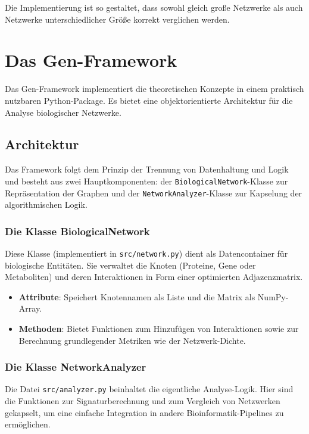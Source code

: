 ﻿\documentclass[a4paper,12pt]{article}
\theoremstyle{definition}
\begin{document}
Die Implementierung ist so gestaltet, dass sowohl gleich große Netzwerke als auch Netzwerke unterschiedlicher Größe korrekt verglichen werden.

\section{Das Gen-Framework}

Das Gen-Framework implementiert die theoretischen Konzepte in einem praktisch nutzbaren Python-Package. Es bietet eine objektorientierte Architektur für die Analyse biologischer Netzwerke.

\subsection{Architektur}

Das Framework folgt dem Prinzip der Trennung von Datenhaltung und Logik und besteht aus zwei Hauptkomponenten: der \texttt{BiologicalNetwork}-Klasse zur Repräsentation der Graphen und der \texttt{NetworkAnalyzer}-Klasse zur Kapselung der algorithmischen Logik.

\subsubsection{Die Klasse BiologicalNetwork}

Diese Klasse (implementiert in \texttt{src/network.py}) dient als Datencontainer für biologische Entitäten. Sie verwaltet die Knoten (Proteine, Gene oder Metaboliten) und deren Interaktionen in Form einer optimierten Adjazenzmatrix.
\begin{itemize}
	\item \textbf{Attribute}: Speichert Knotennamen als Liste und die Matrix als NumPy-Array.
	\item \textbf{Methoden}: Bietet Funktionen zum Hinzufügen von Interaktionen sowie zur Berechnung grundlegender Metriken wie der Netzwerk-Dichte.
\end{itemize}

\subsubsection{Die Klasse NetworkAnalyzer}

Die Datei \texttt{src/analyzer.py} beinhaltet die eigentliche Analyse-Logik. Hier sind die Funktionen zur Signaturberechnung und zum Vergleich von Netzwerken gekapselt, um eine einfache Integration in andere Bioinformatik-Pipelines zu ermöglichen.
\end{document}
